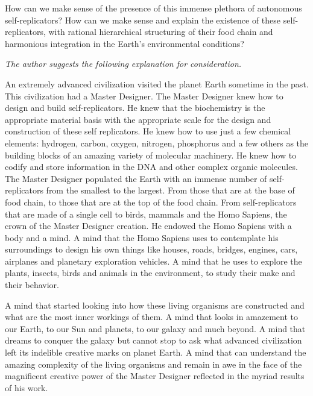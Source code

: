 How can we make sense of the presence of this immense plethora of
autonomous self-replicators? How can we make sense and explain the
existence of these self-replicators, with rational hierarchical
structuring of their food chain and harmonious integration in the
Earth’s environmental conditions?

\textit{The author suggests the following explanation for
consideration.}

An extremely advanced civilization visited the planet Earth sometime in
the past. This civilization had a Master Designer.  The Master Designer
knew how to design and build self-replicators. He knew that the
biochemistry is the appropriate material basis with the appropriate
scale for the design and construction of these self replicators. He
knew how to use just a few chemical elements: hydrogen, carbon, oxygen,
nitrogen, phosphorus and a few others as the building blocks of an
amazing variety of molecular machinery. He knew how to codify and store
information in the DNA and other complex organic molecules. The Master
Designer populated the Earth with an immense number of self-replicators
from the smallest to the largest. From those that are at the base of
food chain, to those that are at the top of the food chain. From
self-replicators that are made of a single cell to birds, mammals and
the Homo Sapiens, the crown of the Master Designer creation.  He
endowed the Homo Sapiens with a body and a mind. A mind that the Homo
Sapiens uses to contemplate his surroundings to design his own things
like houses, roads, bridges, engines, cars, airplanes and planetary
exploration vehicles. A mind that he uses to explore the plants,
insects, birds and animals in the environment, to study their make and
their behavior.

A mind that started looking into how these living organisms are
constructed and what are the most inner workings of them. A mind that
looks in amazement to our Earth, to our Sun and planets, to our galaxy
and much beyond. A mind that dreams to conquer the galaxy but cannot
stop to ask what advanced civilization left its indelible creative
marks on planet Earth. A mind that can understand the amazing
complexity of the living organisms and remain in awe in the face of the
magnificent creative power of the Master Designer reflected in the
myriad results of his work.
